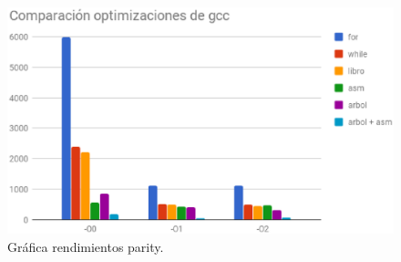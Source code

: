 \documentclass{article}
\begin{document}
    \begin{figure}[H]
      \centering
      \includegraphics[width=\textwidth,height=\textheight,keepaspectratio]{parity.eps}
      \caption{Gráfica rendimientos parity.}
    \end{figure}
\end{document}
